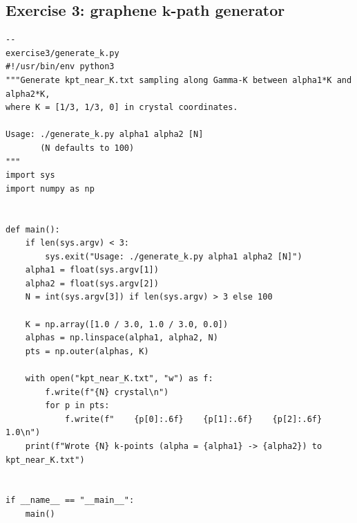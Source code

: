 \documentclass[a4paper,11pt,serif]{article}
\newcommand{\mb}[1]{\mathbf{#1}}
\begin{document}
\subsection*{Exercise 3: graphene $\mb{k}$-path generator}
\begin{scriptsize}
 \begin{Verbatim}[frame=single]
--                                                                 exercise3/generate_k.py
#!/usr/bin/env python3
"""Generate kpt_near_K.txt sampling along Gamma-K between alpha1*K and alpha2*K,
where K = [1/3, 1/3, 0] in crystal coordinates.

Usage: ./generate_k.py alpha1 alpha2 [N]
       (N defaults to 100)
"""
import sys
import numpy as np


def main():
    if len(sys.argv) < 3:
        sys.exit("Usage: ./generate_k.py alpha1 alpha2 [N]")
    alpha1 = float(sys.argv[1])
    alpha2 = float(sys.argv[2])
    N = int(sys.argv[3]) if len(sys.argv) > 3 else 100

    K = np.array([1.0 / 3.0, 1.0 / 3.0, 0.0])
    alphas = np.linspace(alpha1, alpha2, N)
    pts = np.outer(alphas, K)

    with open("kpt_near_K.txt", "w") as f:
        f.write(f"{N} crystal\n")
        for p in pts:
            f.write(f"    {p[0]:.6f}    {p[1]:.6f}    {p[2]:.6f}   1.0\n")
    print(f"Wrote {N} k-points (alpha = {alpha1} -> {alpha2}) to kpt_near_K.txt")


if __name__ == "__main__":
    main()
\end{Verbatim}
\end{scriptsize}
\end{document}
